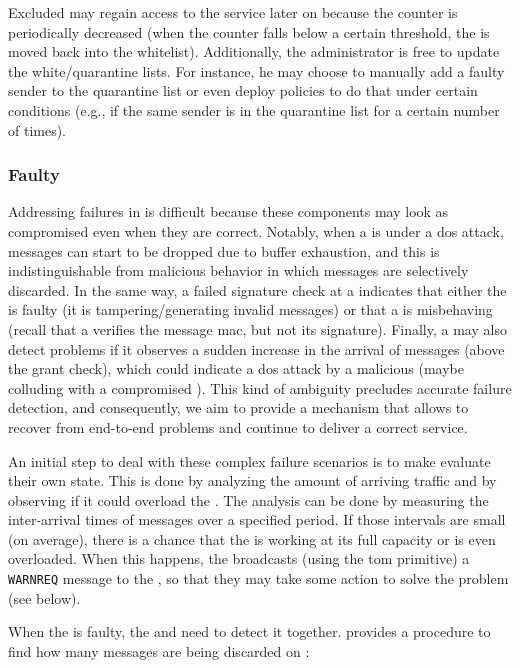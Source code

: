 Excluded \senders may regain access to the service later on because the counter is periodically decreased (when the counter falls below a certain threshold, the \sender is moved back into the whitelist). 
Additionally, the administrator is free to update the white/quarantine lists. 
For instance, he may choose to manually add a faulty sender to the quarantine list or even deploy policies to do that under certain conditions (e.g., if the same sender is in the quarantine list for a certain number of times).


\subsubsection{Faulty \Presieve}
\label{faultypresieve}
Addressing failures in \presieves is difficult because these components may look as compromised even when they are correct.
Notably, when a \presieve is under a \gls{dos} attack, messages can start to be dropped due to buffer exhaustion, and this is indistinguishable from malicious behavior in which messages are selectively discarded.
In the same way, a failed signature check at a \repsieve indicates that either the \presieve is faulty (it is tampering/generating invalid messages) or that a \sender is misbehaving (recall that a \presieve verifies the message \gls{mac}, but not its signature).
Finally, a \repsieve may also detect problems if it observes a sudden increase in the arrival of messages (above the grant check), which could indicate a \gls{dos} attack by a malicious \presieve (maybe colluding with a compromised \sender).
This kind of ambiguity precludes accurate failure detection, and consequently, we aim to provide a mechanism that allows \sieveq to recover from end-to-end problems and continue to deliver a correct service.

An initial step to deal with these complex failure scenarios is to make \presieves evaluate their own state.
This is done by analyzing the amount of arriving traffic and by observing if it could overload the \presieve.
The analysis can be done by measuring the inter-arrival times of messages over a specified period.
If those intervals are small (on average), there is a chance that the \presieve is working at its full capacity or is even overloaded.
When this happens, the \presieve broadcasts (using the \gls{tom} primitive) a \texttt{WARNREQ} message to the \repsieves, so that they may take some action to solve the problem (see below).


When the \presieve is faulty, the \sender and \repsieves need to detect it together.
\sieveq provides a procedure to find how many messages are being discarded on \presieve:


